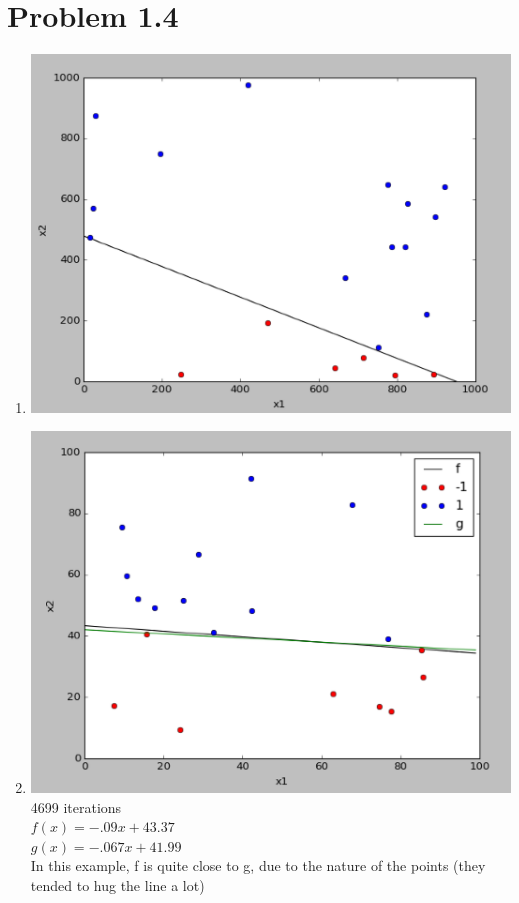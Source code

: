 \documentclass[12pt]{article}
\begin{document}
\section*{Problem 1.4}
\begin{enumerate}[label=(\alph*)]
	\item \includegraphics[scale=.5]{1-4-1.png}
	\item \includegraphics[scale=.5]{1-4-2.png}
	\\ 4699 iterations
	\\ $f(x) = -.09x + 43.37$
	\\ $g(x) = -.067x + 41.99$
	\\ In this example, f is quite close to g, due to the nature of the points (they tended to hug the line a lot)

\end{enumerate}
\end{document}
